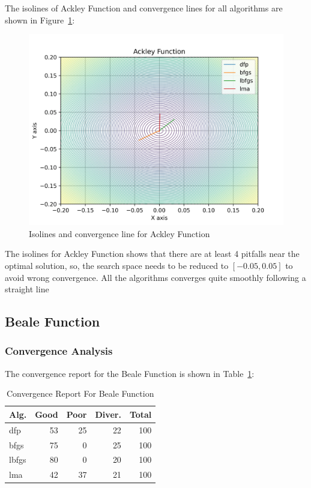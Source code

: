 \documentclass[conference]{IEEEtran}
\begin{document}
The isolines of Ackley Function and convergence lines for all algorithms are shown in Figure~\ref{fig:ackley}:\begin{figure}[H]
\centering
\caption{Isolines and convergence line for Ackley Function}
\label{fig:ackley}
\includegraphics[scale=0.5]{images/ackley.jpg}
\end{figure}
The isolines for Ackley Function shows that there are at least 4 pitfalls near the optimal solution, so, the search space needs to be reduced to $[-0.05, 0.05]$ to avoid wrong convergence. All the algorithms converges quite smoothly following a straight line\subsection{Beale Function}
\label{beale2D}

\subsubsection{Convergence Analysis}
\label{convergencebeale2D}


The convergence report for the Beale Function is shown in Table~\ref{convergence:beale}:

\begin{table}[H]
\centering
\caption{Convergence Report For Beale Function}
\label{convergence:beale}
\begin{tabular}{lrrrr}
\toprule
 Alg. &  Good &  Poor &  Diver. &  Total \\
\midrule
  dfp &    53 &    25 &      22 &    100 \\
 bfgs &    75 &     0 &      25 &    100 \\
lbfgs &    80 &     0 &      20 &    100 \\
  lma &    42 &    37 &      21 &    100 \\
\bottomrule
\end{tabular}
\end{table}
\end{document}
